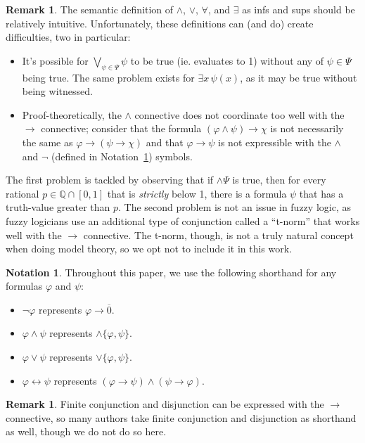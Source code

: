 \documentclass{amsart}
\theoremstyle{definition}
\newtheorem{remark}[theorem]{Remark}
\newtheorem{notation}[theorem]{Notation}
\numberwithin{equation}{theorem}
\renewcommand{\phi}{\varphi}
\newcommand{\Q}{\mathbb{Q}}
\newcommand{\unvee}{{\vee}}
\newcommand{\unwedge}{{\wedge}}
\newcommand{\rat}[1]{{\overline{#1}}}
\newcommand{\narrow}[1]{\xrightarrow{#1}}
\renewcommand{\to}{\narrow{}}
\begin{document}
\begin{remark}\label{rem:issues}
  The semantic definition of $\unwedge$, $\unvee$, $\forall$, and $\exists$ as infs and sups should be relatively intuitive.
  Unfortunately, these definitions can (and do) create difficulties, two in particular:
  \begin{itemize}
  \item 
    It's possible for $\bigvee_{\psi\in\Psi}\psi$ to be true (ie. evaluates to 1) without any of $\psi\in\Psi$ being true.
    The same problem exists for $\exists x\,\psi(x)$, as it may be true without being witnessed.
  \item
    Proof-theoretically, the $\wedge$ connective does not coordinate too well with the $\to$ connective; consider that the formula $(\phi\wedge\psi)\to\chi$ is not necessarily the same as $\phi\to(\psi\to\chi)$ and that $\phi\to\psi$ is not expressible with the $\wedge$ and $\neg$ (defined in Notation~\ref{not:shorthand}) symbols.
  \end{itemize}
  The first problem is tackled by observing that if $\unwedge\Psi$ is true, then for every rational $p\in\Q\cap[0,1]$ that is \emph{strictly} below 1, there is a formula $\psi$ that has a truth-value greater than $p$.
  The second problem is not an issue in fuzzy logic, as fuzzy logicians use an additional type of conjunction called a ``t-norm'' that works well with the $\to$ connective.
  The t-norm, though, is not a truly natural concept when doing model theory, so we opt not to include it in this work.
\end{remark}
\begin{notation}\label{not:shorthand}
  Throughout this paper, we use the following shorthand for any formulas $\phi$ and $\psi$:
  \begin{itemize}
  \item $\neg\phi$ represents $\phi\to\rat 0$.
  \item $\phi\wedge\psi$ represents $\unwedge\{\phi,\psi\}$.
  \item $\phi\vee\psi$ represents $\unvee\{\phi,\psi\}$.
  \item $\phi\leftrightarrow\psi$ represents $(\phi\to\psi)\wedge(\psi\to\phi)$.
  \end{itemize}
\end{notation}
\begin{remark}
  Finite conjunction and disjunction can be expressed with the $\to$ connective, so many authors take finite conjunction and disjunction as shorthand as well, though we do not do so here.
\end{remark}
\end{document}
